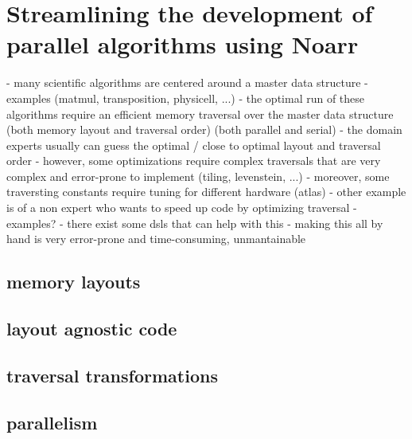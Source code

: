 \chapter{Streamlining the development of parallel algorithms using Noarr}

- many scientific algorithms are centered around a master data structure
  - examples (matmul, transposition, physicell, ...)
- the optimal run of these algorithms require an efficient memory traversal over the master data structure (both memory layout and traversal order) (both parallel and serial)
- the domain experts usually can guess the optimal / close to optimal layout and traversal order
- however, some optimizations require complex traversals that are very complex and error-prone to implement (tiling, levenstein, ...)
- moreover, some traversting constants require tuning for different hardware (atlas)
- other example is of a non expert who wants to speed up code by optimizing traversal - examples?
  - there exist some dsls that can help with this
- making this all by hand is very error-prone and time-consuming, unmantainable




\section{memory layouts}

\section{layout agnostic code}

\section{traversal transformations}

\section{parallelism}
